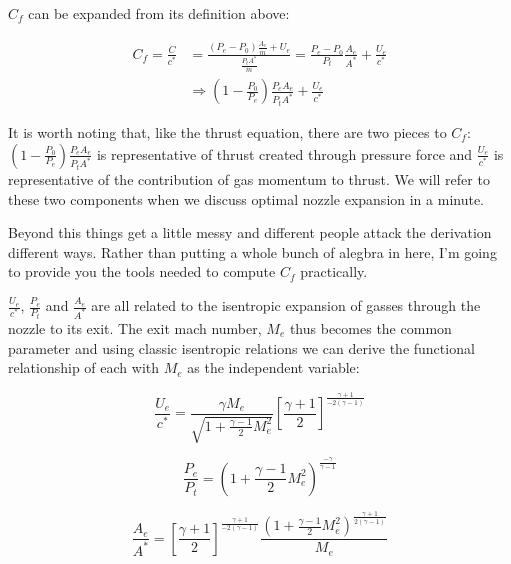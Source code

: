 \documentclass[twocolumn]{memoir} %
\begin{document}
\(C_f\) can be expanded from its definition above:

\begin{equation}
    \begin{split}
        C_f = \frac{C}{c^*} &= \frac{(P_e - P_0)\frac{A_e}{\dot{m}} + U_e}{\frac{P_t A^*}{\dot{m}}} = \frac{P_e - P_0}{P_t}\frac{A_e}{A^*} + \frac{U_e}{c^*} \\
        & \Rightarrow \left(1 - \frac{P_0}{P_e}\right)\frac{P_e A_e}{P_t A^*} + \frac{U_e}{c^*}
    \end{split}
\end{equation}

It is worth noting that, like the thrust equation, there are two pieces
to \(C_f\): $\left(1 - \frac{P_0}{P_e}\right)\frac{P_e A_e}{P_t A^*}$ is representative
of thrust created through pressure force and \(\frac{U_e}{c^*}\) is
representative of the contribution of gas momentum to thrust. We will
refer to these two components when we discuss optimal nozzle expansion
in a minute.

Beyond this things get a little messy and different people attack the
derivation different ways. Rather than putting a whole bunch of alegbra
in here, I'm going to provide you the tools needed to compute \(C_f\)
practically.

\(\frac{U_e}{c^*}\), \(\frac{P_e}{P_t}\) and \(\frac{A_e}{A^*}\) are all
related to the isentropic expansion of gasses through the nozzle to its
exit. The exit mach number, \(M_e\) thus becomes the common parameter
and using classic isentropic relations we can derive the functional
relationship of each with \(M_e\) as the independent variable:

\begin{equation}
    \frac{U_e}{c^*} = \frac{\gamma M_e}{\sqrt{1 + \frac{\gamma - 1}{2}M_e^2}}\left[\frac{\gamma + 1}{2}\right]^{\frac{\gamma + 1}{-2(\gamma-1)}}
\end{equation}

\begin{equation}
    \frac{P_e}{P_t} = \left(1 + \frac{\gamma - 1}{2}M_e^2\right)^{\frac{-\gamma}{\gamma-1}}
\end{equation}

\begin{equation}
    \frac{A_e}{A^*} = \left[\frac{\gamma + 1}{2}\right]^{\frac{\gamma + 1}{-2(\gamma - 1)}} \frac{\left(1 + \frac{\gamma-1}{2}M_e^2 \right)^{\frac{\gamma + 1}{2(\gamma - 1)}}}{M_e}
\end{equation}
\end{document}
